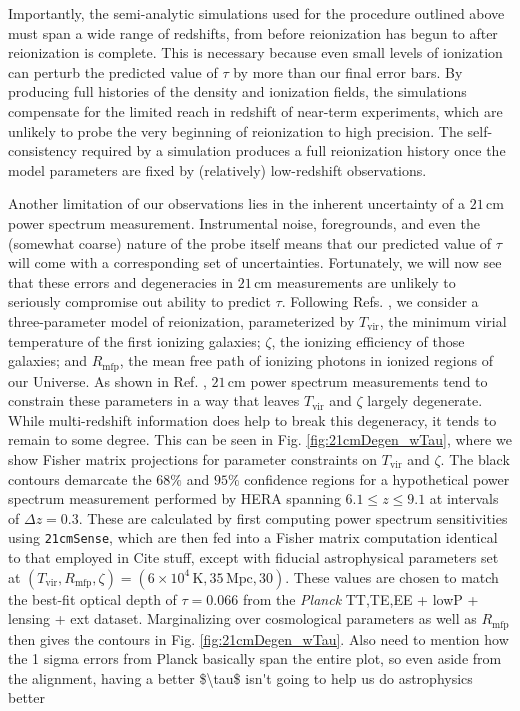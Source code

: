 \documentclass[twocolumn,aps,prd,nofootinbib,showpacs]{revtex4-1}
\begin{document}
Importantly, the semi-analytic simulations used for the procedure outlined above must span a wide range of redshifts, from before reionization has begun to after reionization is complete. This is necessary because even small levels of ionization can perturb the predicted value of $\tau$ by more than our final error bars. By producing full histories of the density and ionization fields, the simulations compensate for the limited reach in redshift of near-term experiments, which are unlikely to probe the very beginning of reionization to high precision. The self-consistency required by a simulation produces a full reionization history once the model parameters are fixed by (relatively) low-redshift observations.

Another limitation of our observations lies in the inherent uncertainty of a $21\,\textrm{cm}$ power spectrum measurement. Instrumental noise, foregrounds, and even the (somewhat coarse) nature of the probe itself means that our predicted value of $\tau$ will come with a corresponding set of uncertainties. Fortunately, we will now see that these errors and degeneracies in $21\,\textrm{cm}$ measurements are unlikely to seriously compromise out ability to predict $\tau$. Following Refs. \cite{mesinger_et_al2012,pober_et_al2014}, we consider a three-parameter model of reionization, parameterized by $T_\textrm{vir}$, the minimum virial temperature of the first ionizing galaxies; $\zeta$, the ionizing efficiency of those galaxies; and $R_\textrm{mfp}$, the mean free path of ionizing photons in ionized regions of our Universe. As shown in Ref. \cite{pober_et_al2014}, $21\,\textrm{cm}$ power spectrum measurements tend to constrain these parameters in a way that leaves $T_\textrm{vir}$ and $\zeta$ largely degenerate. While multi-redshift information does help to break this degeneracy, it tends to remain to some degree. This can be seen in Fig. \ref{fig:21cmDegen_wTau}, where we show Fisher matrix projections for parameter constraints on $T_\textrm{vir}$ and $\zeta$. The black contours demarcate the $68\%$ and $95\%$ confidence regions for a hypothetical power spectrum measurement performed by HERA spanning $6.1 \leq z \leq 9.1$ at intervals of $\Delta z = 0.3$. These are calculated by first computing power spectrum sensitivities using {\tt 21cmSense}, which are then fed into a Fisher matrix computation identical to that employed in \acl{Cite stuff}, except with fiducial astrophysical parameters set at $(T_\textrm{vir}, R_\textrm{mfp}, \zeta) = (6 \times 10^4\,\textrm{K}, 35\,\textrm{Mpc}, 30)$. These values are chosen to match the best-fit optical depth of $\tau =0.066$ from the \emph{Planck} TT,TE,EE + lowP + lensing + ext dataset. Marginalizing over cosmological parameters as well as $R_\textrm{mfp}$ then gives the contours in Fig. \ref{fig:21cmDegen_wTau}. \acl{Also need to mention how the 1 sigma errors from Planck basically span the entire plot, so even aside from the alignment, having a better $\tau$ isn't going to help us do astrophysics better}
\end{document}
